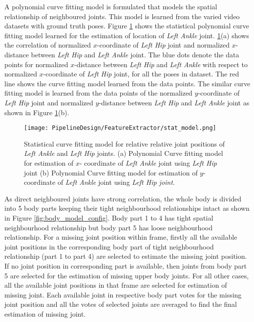 A polynomial curve fitting model is formulated that models the spatial relationship of neighboured joints. This model is learned from the varied video datasets with ground truth poses. Figure \ref{fig:stat_model} shows the statistical polynomial curve fitting model learned for the estimation of location of \textit{Left Ankle} joint. \ref{fig:stat_model}(a) shows the correlation of normalized $x$-coordinate of \textit{Left Hip} joint and normalized $x$-distance between \textit{Left Hip} and \textit{Left Ankle} joint. The blue dots denote the data points for normalized $x$-distance between \textit{Left Hip} and \textit{Left Ankle} with respect to normalized $x$-coordinate of \textit{Left Hip} joint, for all the poses in dataset. The red line shows the curve fitting model learned from the data points. The similar curve fitting model is learned from the data points of the normalized $y$-coordinate of \textit{Left Hip} joint and normalized $y$-distance between \textit{Left Hip} and \textit{Left Ankle} joint as shown in Figure \ref{fig:stat_model}(b).

\begin{figure}[h!]
  \centering
  \texttt{[image: PipelineDesign/FeatureExtractor/stat\_model.png]}
  \caption{Statistical curve fitting model for relative relative joint positions of \textit{Left Ankle}
           and \textit{Left Hip} joints. (a) Polynomial Curve fitting model for estimation of $x$-
           coordinate of \textit{Left Ankle} joint using \textit{Left Hip} joint (b) Polynomial Curve 
           fitting model for estimation of $y$-coordinate of \textit{Left Ankle} joint using 
           \textit{Left Hip joint}. \cite{usman2018}}
  \label{fig:stat_model}
\end{figure} 

As direct neighboured joints have strong correlation, the whole body is divided into 5 body parts keeping their tight neighbourhood relationships intact as shown in Figure \ref{fig:body_model_config}. Body part 1 to 4 has tight spatial neighbourhood relationship but body part 5 has loose neighbourhood relationship. For a missing joint position within frame, firstly all the available joint positions in the corresponding body part of tight neighbourhood relationship (part 1 to part 4) are selected to estimate the missing joint position. If no joint position in corresponding part is available, then joints from body part 5 are selected for the estimation of missing upper body joints. For all other cases, all the available joint positions in that frame are selected for estimation of missing joint. Each available joint in respective body part votes for the missing joint position and all the votes of selected joints are averaged to find the final estimation of missing joint.

